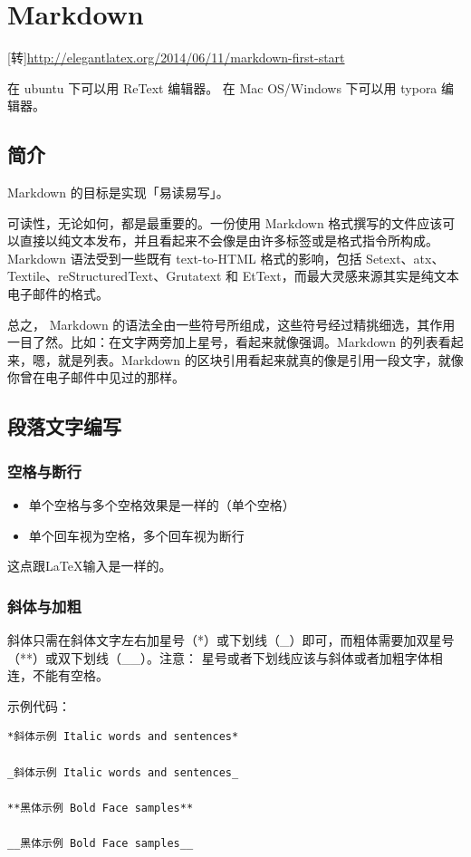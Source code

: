 \chapter{Markdown}
[转]\url{http://elegantlatex.org/2014/06/11/markdown-first-start}

在 ubuntu 下可以用 ReText 编辑器。
在 Mac OS/Windows 下可以用 typora 编辑器。

\section{简介}
Markdown 的目标是实现「易读易写」。

可读性，无论如何，都是最重要的。一份使用 Markdown 格式撰写的文件应该可以直接以纯文本发布，并且看起来不会像是由许多标签或是格式指令所构成。Markdown 语法受到一些既有 text-to-HTML 格式的影响，包括 Setext、atx、Textile、reStructuredText、Grutatext 和 EtText，而最大灵感来源其实是纯文本电子邮件的格式。

总之， Markdown 的语法全由一些符号所组成，这些符号经过精挑细选，其作用一目了然。比如：在文字两旁加上星号，看起来就像强调。Markdown 的列表看起来，嗯，就是列表。Markdown 的区块引用看起来就真的像是引用一段文字，就像你曾在电子邮件中见过的那样。


\section{段落文字编写}
\subsection{空格与断行}
\begin{itemize}
\item 单个空格与多个空格效果是一样的（单个空格）
\item 单个回车视为空格，多个回车视为断行
\end{itemize}
这点跟\LaTeX 输入是一样的。


\subsection{斜体与加粗}
斜体只需在斜体文字左右加星号（*）或下划线（\_）即可，而粗体需要加双星号（**）或双下划线（\_\_）。注意： 星号或者下划线应该与斜体或者加粗字体相连，不能有空格。

示例代码：
\begin{verbatim}
*斜体示例 Italic words and sentences*

_斜体示例 Italic words and sentences_

**黑体示例 Bold Face samples**

__黑体示例 Bold Face samples__
\end{verbatim}


